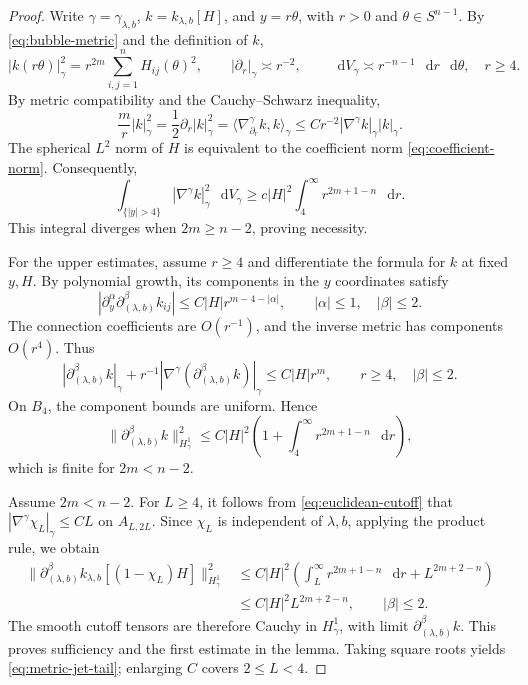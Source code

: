 \documentclass[11pt]{article}
\numberwithin{equation}{section}
\theoremstyle{remark}
\newcommand{\Sph}{S}
\newcommand{\dd}{\mathop{}\!\mathrm{d}}
\begin{document}
\begin{proof}
Write \(\gamma=\gamma_{\lambda,b}\), \(k=k_{\lambda,b}[H]\), and
\(y=r\theta\), with \(r>0\) and \(\theta\in\Sph^{n-1}\).
By \eqref{eq:bubble-metric} and the definition of \(k\),
\[
 |k(r\theta)|_\gamma^2
 =r^{2m}\sum_{i,j=1}^nH_{ij}(\theta)^2,\qquad
 |\partial_r|_\gamma\asymp r^{-2},\qquad
 \dd V_\gamma\asymp r^{-n-1}\,\dd r\,\dd\theta,
 \quad r\ge4.
\]
{By metric compatibility and the Cauchy--Schwarz inequality,}
\[
 \frac{m}{r}|k|_\gamma^2
 =\frac12\partial_r|k|_\gamma^2
 =\langle\nabla^\gamma_{\partial_r}k,k\rangle_\gamma
 \le Cr^{-2}|\nabla^\gamma k|_\gamma|k|_\gamma.
\]
The spherical \(L^2\) norm of \(H\) is equivalent to the coefficient norm
\eqref{eq:coefficient-norm}. Consequently,
\[
 \int_{\{|y|>4\}}|\nabla^\gamma k|_\gamma^2\,\dd V_\gamma
 \ge c|H|^2\int_4^\infty r^{2m+1-n}\,\dd r.
\]
This integral diverges when \(2m\ge n-2\), proving necessity.

For the upper estimates, assume \(r\ge4\) and differentiate the formula for \(k\) at fixed
\(y,H\). {By polynomial growth, its components in the \(y\) coordinates satisfy}
\[
 |\partial_y^\alpha\partial_{(\lambda,b)}^\beta k_{ij}|
 \le C|H|r^{m-4-|\alpha|},
 \qquad |\alpha|\le1,\quad |\beta|\le2.
\]
The connection coefficients are \(O(r^{-1})\), and the inverse metric
has components \(O(r^4)\). Thus
\[
 |\partial_{(\lambda,b)}^\beta k|_\gamma
 +r^{-1}|\nabla^\gamma(\partial_{(\lambda,b)}^\beta k)|_\gamma
 \le C|H|r^m,\qquad r\ge4,\quad|\beta|\le2.
\]
On \(B_4\), the component bounds are uniform. Hence
\[
 \|\partial_{(\lambda,b)}^\beta k\|_{H^1_\gamma}^2
 \le C|H|^2
 \left(1+\int_4^\infty r^{2m+1-n}\,\dd r\right),
\]
which is finite for \(2m<n-2\).

Assume \(2m<n-2\). {For \(L\ge4\), it follows from
\eqref{eq:euclidean-cutoff} that}
\(|\nabla^\gamma\chi_L|_\gamma\le CL\) on \(A_{L,2L}\).
{Since \(\chi_L\) is independent of \(\lambda,b\), applying the
product rule, we obtain}
\[
 \begin{aligned}
 \|\partial_{(\lambda,b)}^\beta
 k_{\lambda,b}[(1-\chi_L)H]\|_{H^1_\gamma}^2
 &\le C|H|^2
 \left(\int_L^\infty r^{2m+1-n}\,\dd r+L^{2m+2-n}\right)\\
 &\le C|H|^2L^{2m+2-n},\qquad |\beta|\le2.
 \end{aligned}
\]
The smooth cutoff tensors are therefore Cauchy in \(H^1_\gamma\),
with limit \(\partial_{(\lambda,b)}^\beta k\).
This proves sufficiency and the first estimate in the lemma.
Taking square roots yields \eqref{eq:metric-jet-tail};
enlarging \(C\) covers \(2\le L<4\).
\end{proof}
\end{document}
